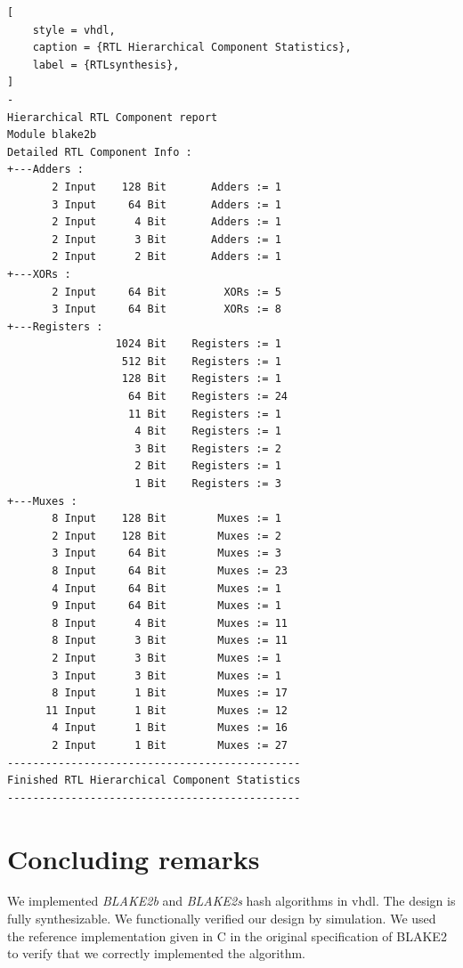 \documentclass[%
	a4paper,
]
{article}
\newcommand{\todo}[1]{\textcolor{red}{#1}}
\begin{document}
\begin{lstlisting}[
	style = vhdl,
	caption = {RTL Hierarchical Component Statistics},
	label = {RTLsynthesis},
]
-
Hierarchical RTL Component report 
Module blake2b 
Detailed RTL Component Info : 
+---Adders : 
	   2 Input    128 Bit       Adders := 1     
	   3 Input     64 Bit       Adders := 1     
	   2 Input      4 Bit       Adders := 1     
	   2 Input      3 Bit       Adders := 1     
	   2 Input      2 Bit       Adders := 1     
+---XORs : 
	   2 Input     64 Bit         XORs := 5     
	   3 Input     64 Bit         XORs := 8     
+---Registers : 
	             1024 Bit    Registers := 1     
	              512 Bit    Registers := 1     
	              128 Bit    Registers := 1     
	               64 Bit    Registers := 24    
	               11 Bit    Registers := 1    
	                4 Bit    Registers := 1     
	                3 Bit    Registers := 2     
	                2 Bit    Registers := 1     
	                1 Bit    Registers := 3     
+---Muxes : 
	   8 Input    128 Bit        Muxes := 1     
	   2 Input    128 Bit        Muxes := 2     
	   3 Input     64 Bit        Muxes := 3     
	   8 Input     64 Bit        Muxes := 23    
	   4 Input     64 Bit        Muxes := 1     
	   9 Input     64 Bit        Muxes := 1     
	   8 Input      4 Bit        Muxes := 11    
	   8 Input      3 Bit        Muxes := 11    
	   2 Input      3 Bit        Muxes := 1     
	   3 Input      3 Bit        Muxes := 1     
	   8 Input      1 Bit        Muxes := 17    
	  11 Input      1 Bit        Muxes := 12    
	   4 Input      1 Bit        Muxes := 16    
	   2 Input      1 Bit        Muxes := 27    
----------------------------------------------
Finished RTL Hierarchical Component Statistics
----------------------------------------------

\end{lstlisting}
%
%
\section{Concluding remarks}
\label{sec:conclusding-remarks}

We implemented \emph{BLAKE2b} and \emph{BLAKE2s} hash algorithms in \gls{vhdl}.
The design is fully synthesizable. We functionally verified our design by
simulation. We used the reference implementation given in C in the original
specification of BLAKE2~\autocite{rfc7693} to verify that we correctly
implemented the algorithm. 
%
%
%
\printbibliography
%
%
\end{document}
